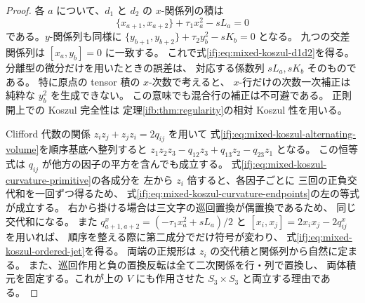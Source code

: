 \begin{proof}
各 $a$ について、$d_1$ と $d_2$ の $x$-関係列の積は
\[
 \{x_{a+1},x_{a+2}\}+\tau_1x_a^2-sL_a=0
\]
である。$y$-関係列も同様に
$\{y_{b+1},y_{b+2}\}+\tau_2y_b^2-sK_b=0$ となる。
九つの交差関係列は $[x_a,y_b]=0$ に一致する。
これで式\eqref{ifj:eq:mixed-koszul-d1d2}を得る。
分離型の微分だけを用いたときの誤差は、
対応する係数列 $sL_a,sK_b$ そのものである。
特に原点の tensor 積の $x$-次数で考えると、
$x$-行だけの次数一次補正は純粋な $y_b^2$ を生成できない。
この意味でも混合行の補正は不可避である。
正則開上での Koszul 完全性は
定理\ref{ifb:thm:regularity}の相対 Koszul 性を用いる。

Clifford 代数の関係 $z_iz_j+z_jz_i=2q_{ij}$ を用いて
式\eqref{ifj:eq:mixed-koszul-alternating-volume}を順序基底へ整列すると
$z_1z_2z_3-q_{12}z_3+q_{13}z_2-q_{23}z_1$ となる。
この恒等式は $q_{ij}$ が他方の因子の平方を含んでも成立する。
式\eqref{ifj:eq:mixed-koszul-curvature-primitive}の各成分を
左から $z_i$ 倍すると、各因子ごとに
三回の正負交代和を一回ずつ得るため、
式\eqref{ifj:eq:mixed-koszul-curvature-endpoints}の左の等式が成立する。
右から掛ける場合は三文字の巡回置換が偶置換であるため、
同じ交代和になる。
また $q^x_{a+1,a+2}=(-\tau_1x_a^2+sL_a)/2$ と
$[x_i,x_j]=2x_ix_j-2q^x_{ij}$ を用いれば、
順序を整える際に第二成分でだけ符号が変わり、
式\eqref{ifj:eq:mixed-koszul-ordered-jet}を得る。
両端の正規形は $z_i$ の交代積と関係列から自然に定まる。
また、巡回作用と負の置換反転は全て二次関係を行・列で置換し、
両体積元を固定する。これが上の $V$ にも作用させた
$S_3\times S_3$ と両立する理由である。
\end{proof}

